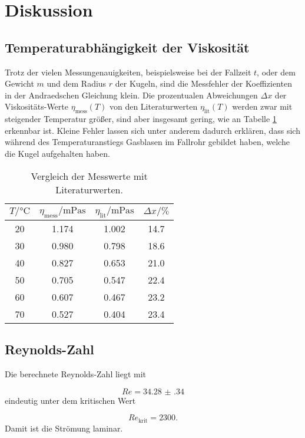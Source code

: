 \section{Diskussion}
\label{sec:Diskussion}

\subsection{Temperaturabhängigkeit der Viskosität}

Trotz der vielen Messungenauigkeiten, beispielsweise bei der Fallzeit $t$, oder
dem Gewicht $m$ und dem Radius $r$ der Kugeln, sind die Messfehler der
Koeffizienten in der Andraedschen Gleichung klein.
Die prozentualen Abweichungen $\Delta x$ der Viskositäts-Werte
$\eta_\text{mess}(T)$ von den
Literaturwerten $\eta_\text{lit}(T)$ \cite{Viskositätliteratur}
werden zwar mit steigender Temperatur größer,
sind aber insgesamt gering,
wie an Tabelle \ref{tab:VglTemperatur} erkennbar ist.
Kleine Fehler lassen sich unter anderem dadurch erklären, dass sich während des
Temperaturanstiegs Gasblasen im Fallrohr gebildet haben, welche die Kugel
aufgehalten haben.

\begin{table}[h]
  \centering
  \caption{Vergleich der Messwerte mit Literaturwerten.}
  \label{tab:VglTemperatur}
  \begin{tabular}{c c c c}
    \toprule
    $T/\si{\celsius}$ & $\eta_\text{mess}/\si{\milli\pascal\second}$ &
    $\eta_\text{lit}/\si{\milli\pascal\second}$ &
    $\Delta x/\si{\percent}$ \\
    \midrule
    20 & 1.174 & 1.002 & 14.7 \\
    30 & 0.980 & 0.798 & 18.6 \\
    40 & 0.827 & 0.653 & 21.0 \\
    50 & 0.705 & 0.547 & 22.4 \\
    60 & 0.607 & 0.467 & 23.2 \\
    70 & 0.527 & 0.404 & 23.4 \\
    \bottomrule
  \end{tabular}
\end{table}


\subsection{Reynolds-Zahl}

Die berechnete Reynolds-Zahl liegt mit

\begin{equation}
  Re = \num{34.28(34)}
\end{equation}
eindeutig unter dem kritischen Wert

\begin{equation}
  Re_\text{krit} = 2300.
\end{equation}
Damit ist die Strömung laminar.
